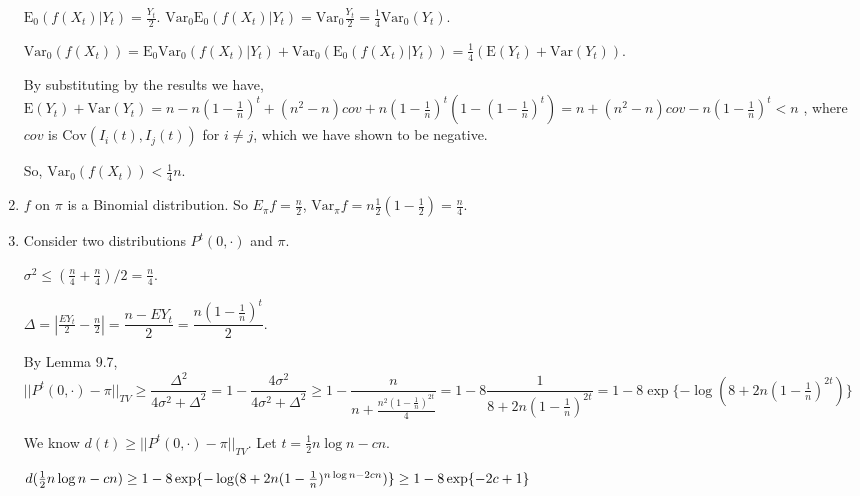 \documentclass[10pt]{article}
\newcommand{\Cov}{\mathrm{Cov}}
\newcommand{\E}{\mathrm{E}}
\newcommand{\Var}{\mathrm{Var}}
\begin{document}
\begin{enumerate}
$\E_0(f(X_t) | Y_t) = \frac{Y_t}{2}$.
$\Var_0 \E_0(f(X_t) | Y_t) = \Var_0 \frac{Y_t}{2} = \frac{1}{4} \Var_0 (Y_t)$.

$\Var_0(f(X_t)) = \E_0 \Var_0(f(X_t) | Y_t) + \Var_0 (\E_0(f(X_t) | Y_t)) =
\frac{1}{4} (\E (Y_t) + \Var (Y_t))$.

By substituting by the results we have,
$\E (Y_t) + \Var (Y_t)
= n - n(1 - \frac{1}{n})^t + (n^2 - n) cov + n (1 - \frac{1}{n})^t (1 - (1 -
\frac{1}{n})^t)
= n + (n^2 - n) cov - n (1 - \frac{1}{n})^t
< n
$
, where $cov$ is $\Cov(I_i(t), I_j(t))$ for $i \neq j$, which we have shown to
be negative.

So, $\Var_0(f(X_t)) < \frac{1}{4} n$.

\item $f$ on $\pi$ is a Binomial distribution. So $E_\pi f = \frac{n}{2}$,
$\Var_\pi f = n \frac{1}{2} (1 - \frac{1}{2}) = \frac{n}{4}$.

\item Consider two distributions $P^t(0, \cdot)$ and $\pi$.

$\sigma^2 \leq (\frac{n}{4} + \frac{n}{4}) / 2 = \frac{n}{4}$.

$\Delta = |\frac{EY_t}{2} - \frac{n}{2}| = \dfrac{n - EY_t}{2} =
\dfrac{n(1-\frac{1}{n})^t}{2}$.

By Lemma 9.7, 
$||P^t(0, \cdot) - \pi||_{TV}
\geq \dfrac{\Delta^2}{4 \sigma^2 + \Delta^2}
= 1 - \dfrac{4 \sigma^2}{4 \sigma^2 + \Delta^2}
\geq 1 - \dfrac{n}{n + \frac{n^2(1-\frac{1}{n})^{2t}}{4}}
= 1 - 8 \dfrac{1}{8 + 2n(1-\frac{1}{n})^{2t}}
= 1 - 8 \exp\{-\log(8 + 2n(1-\frac{1}{n})^{2t})\}
$

We know $d(t) \geq ||P^t(0, \cdot) - \pi||_{TV}$. Let $t =
\frac{1}{2}n\log n - cn$.

$d(\frac{1}{2}n\log n - cn)
\geq 1 - 8 \exp\{-\log(8 + 2n(1-\frac{1}{n})^{n\log n - 2cn})\}\\
\geq 1 - 8 \exp\{- 2c + 1\}
$

\end{enumerate}
\end{document}
